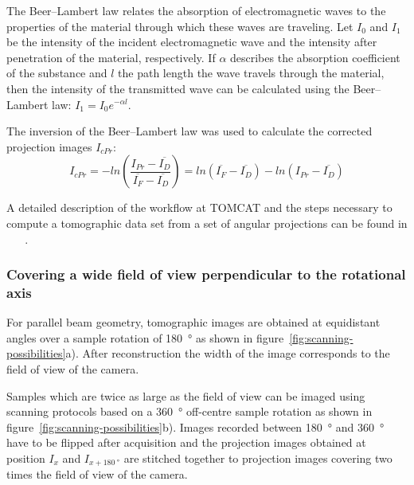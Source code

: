 The Beer--Lambert law relates the absorption of electromagnetic waves to the properties of the material through which these waves are traveling. Let $I_{0}$ and $I_{1}$ be the intensity of the incident electromagnetic wave and the intensity after penetration of the material, respectively. If $\alpha$ describes the absorption coefficient of the substance and $l$ the path length the wave travels through the material, then the intensity of the transmitted wave can be calculated using the Beer--Lambert law: \(I_{1}=I_{0}e^{-\alpha l}\label{eq:beer-lambert}\).

The inversion of the Beer--Lambert law was used to calculate the corrected projection images $I_{cPr}$:
\begin{equation}
	I_{cPr} = -ln\left(\frac{I_{Pr}-\overline{I_{D}}}{\overline{I_{F}}-\overline{I_{D}}}\right)
	= ln(\overline{I_{F}}-\overline{I_{D}})-ln(I_{Pr}-\overline{I_{D}})
	\label{eq:cpr}
\end{equation}

A detailed description of the workflow at TOMCAT and the steps necessary to compute a tomographic data set from a set of angular projections can be found in%
\ifhtml
	~\citet{Hintermueller2009}
\else
	~
\fi%
.

\subsubsection{Covering a wide field of view perpendicular to the rotational axis}%
For parallel beam geometry, tomographic images are obtained at equidistant angles over a sample rotation of \SI{180}{\degree} as shown in figure~\ref{fig:scanning-possibilities}a). After reconstruction the width of the image corresponds to the field of view of the camera.

Samples which are twice as large as the field of view can be imaged using scanning protocols based on a \SI{360}{\degree} off-centre sample rotation as shown in figure~\ref{fig:scanning-possibilities}b). Images recorded between \SI{180}{\degree} and \SI{360}{\degree} have to be flipped after acquisition and the projection images obtained at position $I_{x}$ and $I_{x+\SI{180}{\degree}}$ are stitched together to projection images covering two times the field of view of the camera.

